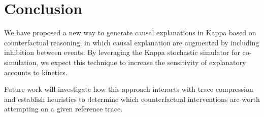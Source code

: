 










\section*{Conclusion}

We have proposed a new way to generate causal explanations in Kappa
based on counterfactual reasoning, in which causal explanation are
augmented by including inhibition between events. By leveraging the
Kappa stochastic simulator for co-simulation, we expect this technique
to increase the sensitivity of explanatory accounts to kinetics.

Future work will investigate how this approach interacts with trace
compression \cite{DBLP:conf/fsttcs/DanosFFHH12} and establish
heuristics to determine which counterfactual interventions are worth
attempting on a given reference trace.
